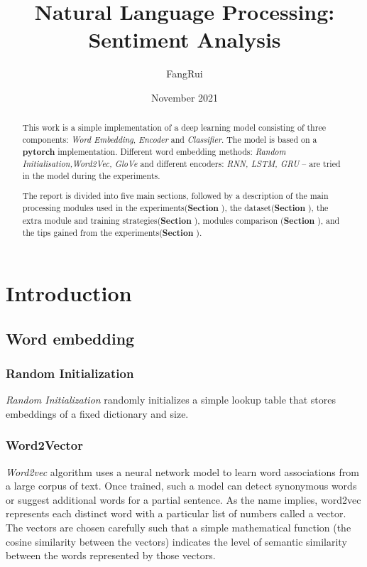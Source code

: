 \documentclass[12pt, a4paper]{article}
\title{Natural Language Processing: Sentiment Analysis}
\author{FangRui}
\date{November 2021}
\begin{document}
\maketitle
	\begin{abstract}
		This work is a simple implementation of a deep learning model consisting of three components: \textit{Word Embedding}, \textit{Encoder} and \textit{Classifier}. The model is based on a \textbf{pytorch} implementation. Different word embedding methods: \textit{Random Initialisation,Word2Vec, GloVe} and different encoders: \textit{RNN, LSTM, GRU} -- are tried in the model during the experiments.
		
		The report is divided into five main sections, followed by a description of the main processing modules used in the experiments(\textbf{Section \uppercase\expandafter{}}), the dataset(\textbf{Section \uppercase\expandafter{}}), the extra module and training strategies(\textbf{Section \uppercase\expandafter{}}), modules comparison (\textbf{Section \uppercase\expandafter{}}), and the tips gained from the experiments(\textbf{Section \uppercase\expandafter{}}).
	\end{abstract}

	\section{Introduction}
	\subsection{Word embedding}
	\subsubsection{Random Initialization}
	\textit{Random Initialization} randomly initializes a simple lookup table that stores embeddings of a fixed dictionary and size.
	\subsubsection{Word2Vector}
	\textit{Word2vec} algorithm uses a neural network model to learn word associations from a large corpus of text. Once trained, such a model can detect synonymous words or suggest additional words for a partial sentence. As the name implies, word2vec represents each distinct word with a particular list of numbers called a vector. The vectors are chosen carefully such that a simple mathematical function (the cosine similarity between the vectors) indicates the level of semantic similarity between the words represented by those vectors.
\end{document}
